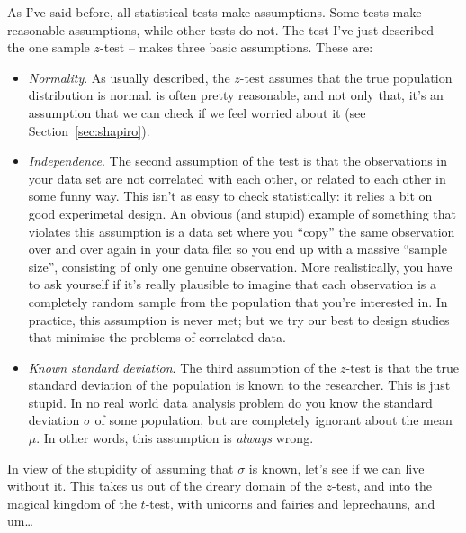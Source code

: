  

As I've said before, all statistical tests make assumptions. Some tests make reasonable assumptions, while other tests do not. The test I've just described -- the one sample $z$-test -- makes three basic assumptions.  These are:
\begin{itemize}
\item {\it Normality}. As usually described, the $z$-test assumes that the true population distribution is normal. is often pretty reasonable, and not only that, it's an assumption that we can check if we feel worried about it (see Section~\ref{sec:shapiro}). 
\item {\it Independence}. The second assumption of the test is that the observations in your data set are not correlated with each other, or related to each other in some funny way. This isn't as easy to check statistically: it relies a bit on good experimetal design. An obvious (and stupid) example of something that violates this assumption is a data set where you ``copy'' the same observation over and over again in your data file: so you end up with a massive ``sample size'', consisting of only one genuine observation. More realistically, you have to ask yourself if it's really plausible to imagine that each observation is a completely random sample from the population that you're interested in. In practice, this assumption is never met; but we try our best to design studies that minimise the problems of correlated data. 
\item {\it Known standard deviation}. The third assumption of the $z$-test is that the true standard deviation of the population is known to the researcher. This is just stupid. In no real world data analysis problem do you know the standard deviation $\sigma$ of some population, but are completely ignorant about the mean $\mu$. In other words, this assumption is {\it always} wrong. 
\end{itemize}
In view of the stupidity of assuming that $\sigma$ is known, let's see if we can live without it. This takes us out of the dreary domain of the $z$-test, and into the magical kingdom of the $t$-test, with unicorns and fairies and leprechauns, and um\ldots

